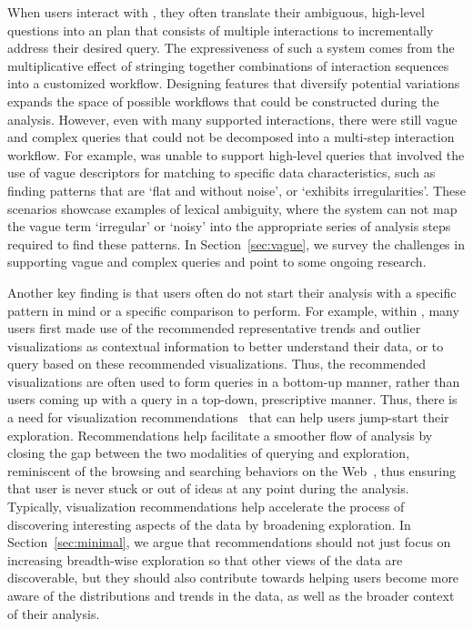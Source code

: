 When users interact with \zv, 
they often translate their ambiguous, 
high-level questions 
into an plan that consists of multiple interactions 
to incrementally address their desired query. 
The expressiveness of such a system 
comes from the multiplicative effect 
of stringing together combinations of 
interaction sequences into a customized workflow. 
Designing features that diversify potential 
variations expands the space of possible workflows 
that could be constructed during the analysis. 
However, even with many supported interactions, 
there were still vague and complex queries 
that could not be decomposed 
into a multi-step interaction workflow. 
For example, \zv was unable to support 
high-level queries that involved the use of vague 
descriptors for matching to specific data 
characteristics, such as finding patterns that 
are `flat and without noise', or `exhibits irregularities'. 
These scenarios showcase examples of lexical ambiguity, 
where the system can not map the vague term `irregular' or `noisy' 
into the appropriate series of analysis steps 
required to find these patterns. 
In Section~\ref{sec:vague}, we survey the challenges 
in supporting vague and complex queries 
and point to some ongoing research.

Another key finding is that 
users often do not start their analysis 
with a specific pattern in mind or a specific comparison to perform. 
For example, within \zv, many users 
first made use of the recommended 
representative trends and outlier visualizations 
as contextual information 
to better understand their data, 
or to query based on these recommended visualizations.
Thus, the recommended visualizations
are often used to form queries in a bottom-up
manner, rather than users coming up with a query
in a top-down, prescriptive manner.
Thus, there is a need for visualization recommendations~\cite{Vartak2017}
that can help users jump-start their exploration.
Recommendations help facilitate a smoother flow
of analysis by closing the gap between the two modalities
of querying and exploration, 
reminiscent of the browsing and searching 
behaviors on the Web~\cite{Olston2003}, thus 
ensuring that user is never stuck or out of 
ideas at any point during the analysis. 
Typically, visualization recommendations help 
accelerate the process of discovering 
interesting aspects of the data by broadening exploration. 
In Section~\ref{sec:minimal}, we argue 
that recommendations should not just focus on 
increasing breadth-wise exploration
so that other views of the data are discoverable,
but they should also contribute
towards helping users become more aware of the 
distributions and trends in the data,
as well as the broader context of their analysis.

